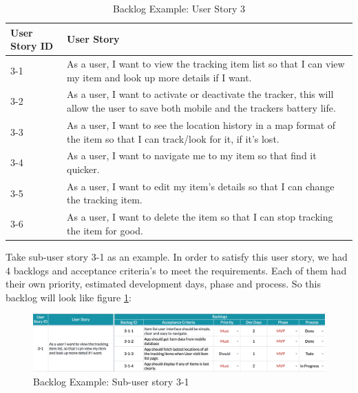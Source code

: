 \documentclass[12pt,a4paper]{article}
\begin{document}
          \begin{table}[H]
            \centering
              \begin{tabularx}{\textwidth}{l X}
                \hline
                 User Story ID & User Story \\ \hline
                 3-1 & As a user, I want to view the tracking item list so that I can view my item and look up more details if I want. \\
                 3-2 & As a user, I want to activate or deactivate the tracker, this will allow the user to save both mobile and the trackers battery life. \\
                 3-3 & As a user, I want to see the location history in a map format of the item so that I can track/look for it, if it's lost. \\
                 3-4 & As a user, I want to navigate me to my item so that find it quicker. \\
                 3-5 & As a user, I want to edit my item's details so that I can change the tracking item. \\
                 3-6 & As a user, I want to delete the item so that I can stop tracking the item for good. \\
                \hline
              \end{tabularx}
              \caption[Table caption text]{Backlog Example: User Story 3}
              \label{table:Backlog Example: User Story 3}
          \end{table}   
          
          Take sub-user story 3-1 as an example. In order to satisfy this user story, we had 4 backlogs and acceptance criteria's to meet the requirements. Each of them had their own priority, estimated development days, phase and process. So this backlog will look like figure \ref{fig:Backlog Example: Sub-user story 3-1}:
          
          \begin{figure}[H]
            \centering
            \includegraphics[width=1\textwidth]{../assets/development-records-backlog-example.png}
            \caption{Backlog Example: Sub-user story 3-1}
            \label{fig:Backlog Example: Sub-user story 3-1}
          \end{figure}
          
\end{document}
